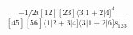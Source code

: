 \documentclass[varwidth, border=5pt]{standalone}
\begin{document}
\begin{my}
$\begin{gathered}
\scriptscriptstyle\frac{-1/2i[12][23]\langle3|1+2|4]^4}{[45][56]\langle1|2+3|4]\langle3|1+2|6]s_{123}}
\end{gathered}$
\end{my}
\end{document}
